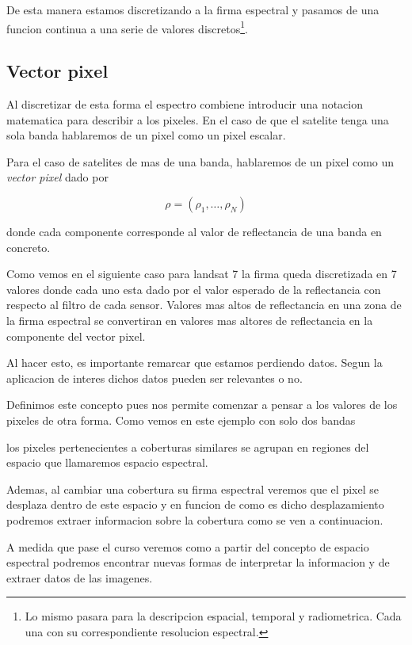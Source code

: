 \documentclass[a4paper,12pt]{article}
\begin{document}
De esta manera estamos discretizando a la firma espectral y pasamos de una
funcion continua a una serie de valores discretos\footnote{Lo mismo pasara
para la descripcion espacial, temporal y radiometrica. Cada una con su
correspondiente resolucion espectral.}.

\subsection{Vector pixel}

Al discretizar de esta forma el espectro combiene introducir una notacion
matematica para describir a los pixeles. En el caso de que el satelite tenga una
sola banda hablaremos de un pixel como un pixel escalar.

Para el caso de satelites de mas de una banda, hablaremos de un pixel como un
\emph{vector pixel} dado por

\begin{equation}
  \rho = (\rho_1, \ldots, \rho_N)
\end{equation}

donde cada componente corresponde al valor de reflectancia de una banda en
concreto.

Como vemos en el siguiente caso para landsat 7 la firma queda discretizada en 7
valores donde cada uno esta dado por el valor esperado de la reflectancia con
respecto al filtro de cada sensor. Valores mas altos de reflectancia en una zona
de la firma espectral se convertiran en valores mas altores de reflectancia en
la componente del vector pixel.

Al hacer esto, es importante remarcar que estamos perdiendo datos. Segun la
aplicacion de interes dichos datos pueden ser relevantes o no. 

Definimos este concepto pues nos permite comenzar a pensar a los valores de los
pixeles de otra forma. Como vemos en este ejemplo con solo dos bandas

los pixeles pertenecientes a coberturas similares se agrupan en regiones del
espacio que llamaremos espacio espectral.

Ademas, al cambiar una cobertura su firma espectral veremos que el pixel se
desplaza dentro de este espacio y en funcion de como es dicho desplazamiento
podremos extraer informacion sobre la cobertura como se ven a continuacion.

A medida que pase el curso veremos como a partir del concepto de espacio
espectral podremos encontrar nuevas formas de interpretar la informacion y de
extraer datos de las imagenes.
\end{document}
